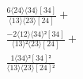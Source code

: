 \documentclass[varwidth, border=5pt]{standalone}
\begin{document}
\begin{my}
$\begin{gathered}
\scriptscriptstyle\frac{6⟨24⟩⟨34⟩[34]}{⟨13⟩⟨23⟩[24]} +\\
\scriptscriptstyle\frac{-2⟨12⟩⟨34⟩²[34]}{⟨13⟩²⟨23⟩[24]} +\\
\scriptscriptstyle\frac{1⟨34⟩²[34]²}{⟨13⟩⟨23⟩[24]²} \phantom{+}
\end{gathered}$
\end{my}
\end{document}
